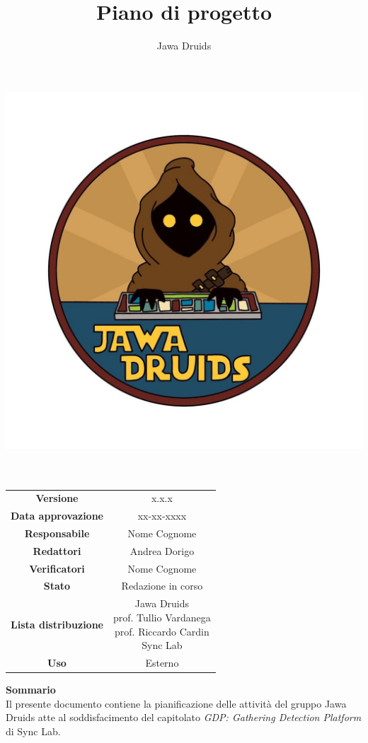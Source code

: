 \documentclass[a4paper,12pt]{report}
\begin{document}
\makeatletter
\begin{titlepage}
    \begin{center}
    \vspace*{-5,0cm}
    \author{Jawa Druids}
    \title{Piano di progetto}
    \date{} %
    \includegraphics[width=0.7\linewidth]{../immagini/DRUIDSLOGO.jpg}\\[4ex]
    {\huge \bfseries  \@title }\\[2ex]
    {\LARGE  \@author}\\[50ex]
    \vspace*{-8,0cm}
    \begin{table}[H]
        \centering
        \begin{tabular}{c|c}
            \textbf{Versione} & x.x.x \\
            \textbf{Data approvazione} & xx-xx-xxxx\\
            \textbf{Responsabile} & Nome Cognome\\
            \textbf{Redattori} & Andrea Dorigo \\
            \textbf{Verificatori} & Nome Cognome \\
            \textbf{Stato} & Redazione in corso\\
            \textbf{Lista distribuzione} & \makecell{Jawa Druids \\ prof. Tullio Vardanega \\ prof. Riccardo Cardin \\ Sync Lab}\\
            \textbf{Uso} & Esterno
        \end{tabular}
    \end{table}
					\vspace{.4cm}
	\hfill \break
    \fontsize{17}{10}\textbf{Sommario}\\
		\vspace{.3cm}
    Il presente documento contiene la pianificazione delle attività del gruppo Jawa Druids atte al soddisfacimento del capitolato \normalsize\textit{GDP: Gathering Detection Platform} di Sync Lab.
    \end{center}
\end{titlepage}
\makeatother


\tableofcontents
\listoffigures
\listoftables


\end{document}
